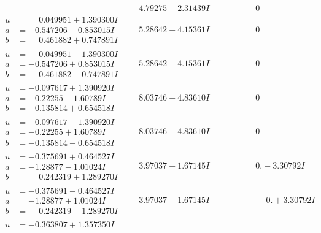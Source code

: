 \documentclass[1p]{elsarticle_modified}
\theoremstyle{definition}
\begin{document}
$$\begin{array}{c|c|c}
 & \phantom{-}4.79275 - 2.31439 I & \phantom{-0.000000 } 0 \\ \hline\begin{aligned}
u &= \phantom{-}0.049951 + 1.390300 I \\
a &= -0.547206 - 0.853015 I \\
b &= \phantom{-}0.461882 + 0.747891 I\end{aligned}
 & \phantom{-}5.28642 + 4.15361 I & \phantom{-0.000000 } 0 \\ \hline\begin{aligned}
u &= \phantom{-}0.049951 - 1.390300 I \\
a &= -0.547206 + 0.853015 I \\
b &= \phantom{-}0.461882 - 0.747891 I\end{aligned}
 & \phantom{-}5.28642 - 4.15361 I & \phantom{-0.000000 } 0 \\ \hline\begin{aligned}
u &= -0.097617 + 1.390920 I \\
a &= -0.22255 - 1.60789 I \\
b &= -0.135814 + 0.654518 I\end{aligned}
 & \phantom{-}8.03746 + 4.83610 I & \phantom{-0.000000 } 0 \\ \hline\begin{aligned}
u &= -0.097617 - 1.390920 I \\
a &= -0.22255 + 1.60789 I \\
b &= -0.135814 - 0.654518 I\end{aligned}
 & \phantom{-}8.03746 - 4.83610 I & \phantom{-0.000000 } 0 \\ \hline\begin{aligned}
u &= -0.375691 + 0.464527 I \\
a &= -1.28877 - 1.01024 I \\
b &= \phantom{-}0.242319 + 1.289270 I\end{aligned}
 & \phantom{-}3.97037 + 1.67145 I & \phantom{-0.000000 } 0. - 3.30792 I \\ \hline\begin{aligned}
u &= -0.375691 - 0.464527 I \\
a &= -1.28877 + 1.01024 I \\
b &= \phantom{-}0.242319 - 1.289270 I\end{aligned}
 & \phantom{-}3.97037 - 1.67145 I & \phantom{-0.000000 -}0. + 3.30792 I \\ \hline\begin{aligned}
u &= -0.363807 + 1.357350 I \\

\end{aligned}
\end{array}$$
\end{document}
